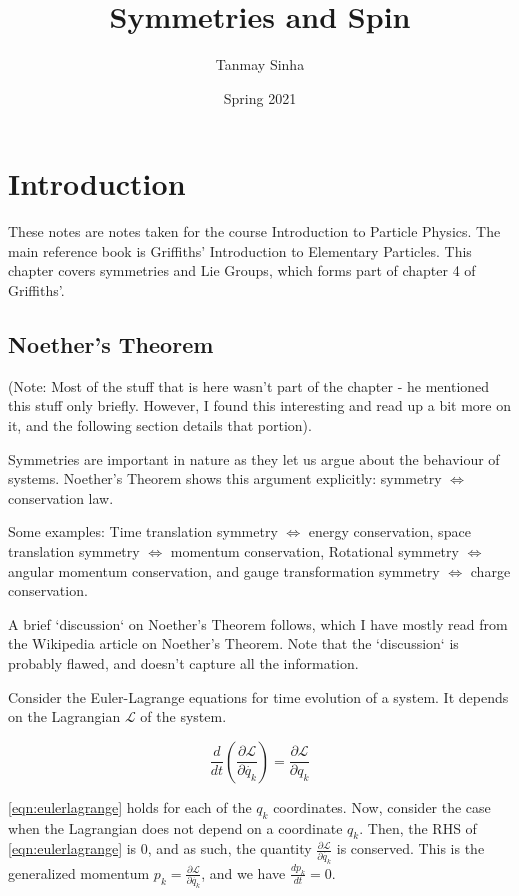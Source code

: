 \documentclass[11pt]{book}
\title{Symmetries and Spin}
\author{Tanmay Sinha}
\date{Spring 2021}
\newcommand{\lagrangian}{\mathcal{L}}
\begin{document}
\maketitle
\tableofcontents

\chapter{Introduction}
These notes are notes taken for the course Introduction to Particle Physics. The main reference book is Griffiths' Introduction to Elementary Particles. This chapter covers symmetries and Lie Groups, which forms part of chapter 4 of Griffiths'.

\section{Noether's Theorem}
(Note: Most of the stuff that is here wasn't part of the chapter - he mentioned this stuff only briefly. However, I found this interesting and read up a bit more on it, and the following section details that portion).


Symmetries are important in nature as they let us argue about the behaviour of systems. Noether's Theorem shows this argument explicitly: symmetry $\iff$ conservation law.

Some examples: Time translation symmetry $\iff$ energy conservation, space translation symmetry $\iff$ momentum conservation, Rotational symmetry $\iff$ angular momentum conservation, and gauge transformation symmetry $\iff$ charge conservation.

A brief `discussion` on Noether's Theorem follows, which I have mostly read from the Wikipedia article on Noether's Theorem. Note that the `discussion` is probably flawed, and doesn't capture all the information.


Consider the Euler-Lagrange equations for time evolution of a system. It depends on the Lagrangian $\lagrangian$ of the system.

\begin{equation}\label{eqn:eulerlagrange}
\frac{d}{dt} \left( \frac{\partial \lagrangian}{\partial \dot{q_k}}\right) = \frac{\partial \lagrangian}{\partial q_k} 
\end{equation}

\eqref{eqn:eulerlagrange} holds for each of the $q_k$ coordinates. Now, consider the case when the Lagrangian does not depend on a coordinate $q_k$. Then, the RHS of \eqref{eqn:eulerlagrange} is 0, and as such, the quantity $\frac{\partial \lagrangian}{\partial \dot{q_k}}$ is conserved. This is the generalized momentum $p_k = \frac{\partial \lagrangian}{\partial \dot{q_k}}$, and we have $\frac{dp_k}{dt} = 0$.
\end{document}
